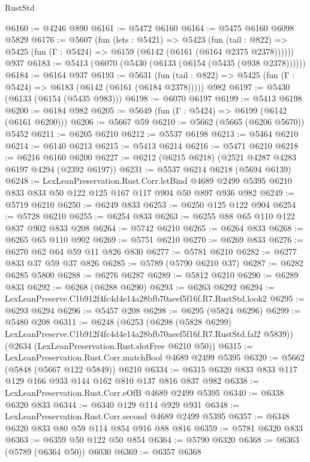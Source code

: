 \begin{lexlean}{RustStd}
\begin{coremodule}
@6160 := @4246 @890
@6161 := @5472 @6160
@6164 := @5475 @6160 @6098 @5829
@6176 := @5607
    (fun (lets : @5421) =>
    @5423
      (fun (tail : @822) => @5425 (fun (Γ : @5424) => @6159 (@6142 (@6161 (@6164 @2375 @2378))))))
    @937
@6183 := @5413 (@6070 (@5430 (@6133 (@6154 (@5435 (@938 @2378))))))
@6184 := @6164 @937
@6193 := @5631
    (fun (tail : @822) => @5425 (fun (Γ : @5424) => @6183 (@6142 (@6161 (@6184 @2378)))))
    @982
@6197 := @5430 (@6133 (@6154 (@5435 @983)))
@6198 := @6070 @6197
@6199 := @5413 @6198
@6200 := @6184 @982
@6205 := @5649 (fun (Γ : @5424) => @6199 (@6142 (@6161 @6200)))
@6206 := @5667 @59
@6210 := @5662 (@5665 (@6206 @5670)) @5452
@6211 := @6205 @6210
@6212 := @5537 @6198
@6213 := @5464 @6210
@6214 := @6140 @6213
@6215 := @5413 @6214
@6216 := @5471 @6210
@6218 := @6216 @6160 @6200
@6227 := @6212 (@6215 @6218) (@2521 @4287 @4283 @6197 @4294 (@2392 @6197))
@6231 := @5537 @6214 @6218 (@5694 @6139)
@6248 := LexLeanPreservation.Rust.Corr.letBind
    @4689
    @2499
    @5395
    @6210
    @833
    @833
    @50
    @122
    @125
    @167
    @117
    @904
    @50
    @897
    @936
    @982
@6249 := @5719 @6210
@6250 := @6249 @833
@6253 := @6250 @125 @122 @904
@6254 := @5728 @6210
@6255 := @6254 @833
@6263 := @6255 @88 @65 @110 @122 @837 @902 @833 @208
@6264 := @5742 @6210
@6265 := @6264 @833
@6268 := @6265 @65 @110 @902
@6269 := @5751 @6210
@6270 := @6269 @833
@6276 := @6270 @62 @64 @59 @11 @826 @830
@6277 := @5781 @6210
@6282 := @6277 @833 @37 @59 @37 @826
@6285 := @5789 (@5790 @6210 @37)
@6287 := @6282 @6285 @5800
@6288 := @6276 @6287
@6289 := @5812 @6210
@6290 := @6289 @833
@6292 := @6268 (@6288 @6290)
@6293 := @6263 @6292
@6294 := LexLeanPreserve.C1b912f4fc4d4e14a28bfb70aeef5f16f.R7.RustStd.look2
@6295 := @6293 @6294
@6296 := @5457 @208
@6298 := @6295 (@5824 @6296)
@6299 := @5480 @208
@6311 := @6248
    (@6253
      (@6298 (@5828 @6299) LexLeanPreserve.C1b912f4fc4d4e14a28bfb70aeef5f16f.R7.RustStd.fal2 @5839))
    (@2634 (LexLeanPreservation.Rust.slotFree @6210 @50))
@6315 := LexLeanPreservation.Rust.Corr.matchBool @4689 @2499 @5395
@6320 := @5662 (@5848 (@5667 @122 @5849)) @6210
@6334 := @6315 @6320 @833 @833 @117 @129 @166 @933 @144 @162 @810 @137 @816 @837 @982
@6338 := LexLeanPreservation.Rust.Corr.eOfB @4689 @2499 @5395
@6340 := @6338 @6320 @833
@6344 := @6340 @129 @114 @929 @931
@6348 := LexLeanPreservation.Rust.Corr.second @4689 @2499 @5395
@6357 := @6348 @6320 @833 @80 @59 @114 @854 @916 @88 @816
@6359 := @5781 @6320 @833
@6363 := @6359 @50 @122 @50 @854
@6364 := @5790 @6320
@6368 := @6363 (@5789 (@6364 @50)) @6030
@6369 := @6357 @6368

\end{coremodule}
\end{lexlean}
